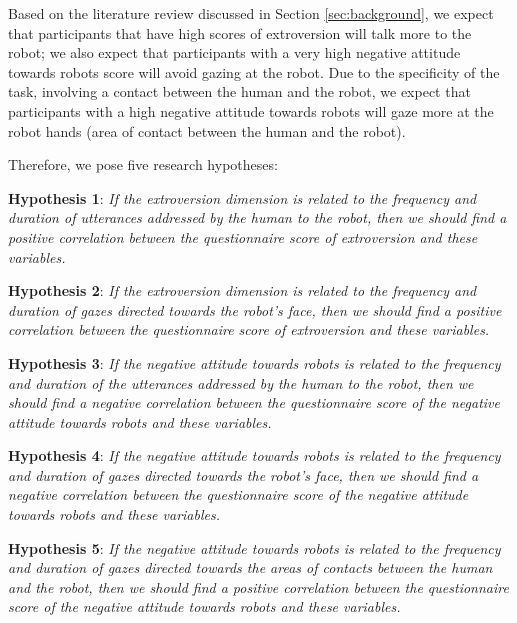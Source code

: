 Based on the literature review discussed in Section \ref{sec:background}, we expect that participants that have high scores of extroversion will talk more to the robot; we also expect that participants with a very high negative attitude towards robots score will avoid gazing at the robot. 
Due to the specificity of the task, involving a contact between the human and the robot, we expect that participants with a high negative attitude towards robots will gaze more at the robot hands (area of contact between the human and the robot).

Therefore, we pose five research hypotheses:

\medskip
\textbf{Hypothesis 1}: 
\textit{If the extroversion dimension is related to the frequency and duration of utterances addressed by the human to the robot, then we should find a positive correlation between the questionnaire score of extroversion and these variables.}

\textbf{Hypothesis 2}: 
\textit{If the extroversion dimension is related to  the frequency and duration of gazes directed towards the robot's face, then we should find a positive correlation between the questionnaire score of extroversion and these variables. }

\textbf{Hypothesis 3}: 
\textit{If the negative attitude towards robots is related to the frequency and duration of the utterances addressed by the human to the robot, then we should find a negative correlation between the questionnaire score of the negative attitude towards robots and these variables.}

\textbf{Hypothesis 4}: 
\textit{If the negative attitude towards robots is related to the frequency and duration of gazes directed towards the robot's face, then we should find a negative correlation between the questionnaire score of the negative attitude towards robots and these variables.}

\textbf{Hypothesis 5}: 
\textit{If the negative attitude towards robots is related to the frequency and duration of gazes directed towards the areas of contacts between the human and the robot, then we should find a positive correlation between the questionnaire score of the negative attitude towards robots and these variables.}

